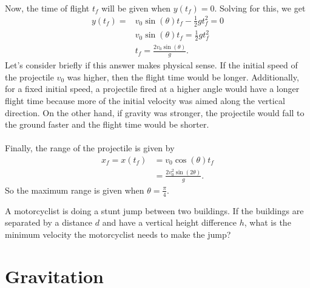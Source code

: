 \documentclass[../classical_mechanics.tex]{subfiles}
\begin{document}
        \paragraph{}
        Now, the time of flight $t_f$ will be given when $y(t_f)=0$.
        Solving for this, we get
        \begin{align}
            y(t_f) = &v_0\sin(\theta)t_f - \frac{1}{2}gt_f^2 = 0\\
            &v_0\sin(\theta)t_f = \frac{1}{2}gt_f^2\\
            &t_f = \frac{2v_0\sin(\theta)}{g}.
        \end{align}
        Let's consider briefly if this answer makes physical sense.
        If the initial speed of the projectile $v_0$ was higher, then the flight time would be longer.
        Additionally, for a fixed initial speed, a projectile fired at a higher angle would have a longer flight time because more of the initial velocity was aimed along the vertical direction.
        On the other hand, if gravity was stronger, the projectile would fall to the ground faster and the flight time would be shorter.

        \paragraph{}
        Finally, the range of the projectile is given by
        \begin{align}
            x_f = x(t_f) &= v_0\cos(\theta)t_f\\
            &= \frac{2v_0^2\sin(2\theta)}{g}.
        \end{align}
        So the maximum range is given when $\theta=\frac{\pi}{4}$.


        \begin{example}
            A motorcyclist is doing a stunt jump between two buildings.
            If the buildings are separated by a distance $d$ and have a vertical height difference $h$, what is the minimum velocity the motorcyclist needs to make the jump?
        \end{example}

    \section{Gravitation}
\end{document}
